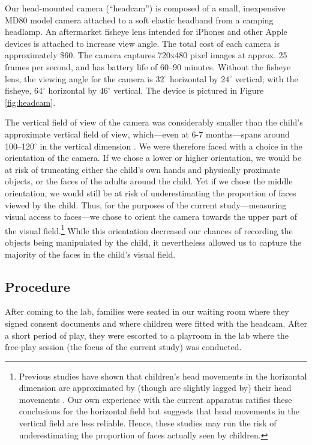 \documentclass[10pt,letterpaper]{article}
\begin{document}
Our head-mounted camera (``headcam'') is composed of a small, inexpensive MD80 model camera attached to a soft elastic headband from a camping headlamp. An aftermarket fisheye lens intended for iPhones and other Apple devices is attached to increase view angle. The total cost of each camera is approximately \$60. The camera captures 720x480 pixel images at approx. 25 frames per second, and has battery life of 60--90 minutes. Without the fisheye lens, the viewing angle for the camera is $32^{\circ}$ horizontal by $24^{\circ}$ vertical; with the fisheye, $64^{\circ}$ horizontal by $46^{\circ}$ vertical. The device is pictured in Figure \ref{fig:headcam}.

The vertical field of view of the camera was considerably smaller than the child's approximate vertical field of view, which---even at 6-7 months---spans around 100--120$^{\circ}$ in the vertical dimension \cite{mayer1988,cummings1988}. We were therefore faced with a choice in the orientation of the camera. If we chose a lower or higher orientation, we would be at risk of truncating either the child's own hands and physically proximate objects, or the faces of the adults around the child. Yet if we chose the middle orientation, we would still be at risk of underestimating the proportion of faces viewed by the child. Thus, for the purposes of the current study---measuring visual access to faces---we chose to orient the camera towards the upper part of the visual field.\footnote{Previous studies have shown that children's head movements in the horizontal dimension are approximated by (though are slightly lagged by) their head movements \cite{yoshida2008}. Our own experience with the current apparatus ratifies these conclusions for the horizontal field but suggests that head movements in the vertical field are less reliable. Hence, these studies may run the risk of underestimating the proportion of faces actually seen by children.} While this orientation decreased our chances of recording the objects being manipulated by the child, it nevertheless allowed us to capture the majority of the faces in the child's visual field.

\subsection{Procedure}

After coming to the lab, families were seated in our waiting room where they signed consent documents and where children were fitted with the headcam. After a short period of play, they were escorted to a playroom in the lab where the free-play session (the focus of the current study) was conducted. 
\end{document}

